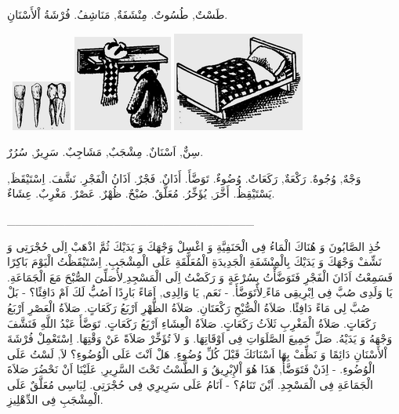 \documentclass[a5paper]{article}
\begin{document}
طَسْتٌ, طُسُوتٌ. مِنْشَفَةٌ, مَنَاشِفُ. فُرْشَةُ اْلأَسْنَانِ. 

\  \includegraphics[width=0.7709in,height=0.6457in]{MuhammadBagauddinlatinized-img210.png}   \includegraphics[width=1.2811in,height=1.2398in]{MuhammadBagauddinlatinized-img211.png}   \includegraphics[width=1.7083in,height=1.2811in]{MuhammadBagauddinlatinized-img212.png} 

سِنٌّ, اَسْنَانٌ. مِشْجَبٌ, مَشَاجِبٌ. سَرِيرٌ, سُرُرٌ. 

وَجْهٌ, وُجُوهٌ. رَكْعَةٌ, رَكَعَاتٌ. وُضُوءٌ. تَوَضَّأَ. أَذَانٌ. فَجْرٌ. اَذَانُ الْفَجْرِ. نَشَّفَ. اِسْتَيْقَظَ, يَسْتَيْقِظُ. أَخَّرَ, يُؤَخِّرُ. مُعَلَّقٌ. صُبْحٌ. ظُهْرٌ. عَصْرٌ. مَغْرِبٌ. عِشَاءٌ.

\_\_\_\_\_\_\_\_\_\_\_\_\_\_\_\_\_\_\_\_\_\_\_\_\_\_\_\_\_\_

خُذِ الصَّابُونَ وَ هُنَاكَ الْمَاءُ فِى الْحَنَفِيَّةِ وَ اغْسِلْ وَجْهَكَ وَ يَدَيْكَ ثُمَّ اذْهَبْ اِلَى حُجْرَتِى وَ نَشِّفْ وَجْهَكَ وَ يَدَيْكَ بِالْمِنْشَفَةِ الْجَدِيدَةِ الْمُعَلَّقَةِ عَلَى الْمِشْجَبِ. اِسْتَيْقَظْتُ الْيَوْمَ بَاكِرًا فَسَمِعْتُ اَذَانَ الْفَجْرِ فَتَوَضَّأْتُ بِسُرْعَةٍ وَ رَكَضْتُ اِلَى الْمَسْجِدِ ِلأُصَلِّىَ الصُّبْحَ مَعَ الْجَمَاعَةِ. يَا وَلَدِى صُبَّ فِى اِبْرِيقِى مَاءً ِلأَتَوَضَّأَ. - نَعَم, يَا وَالِدِى, اَمَاءً بَارِدًا اَصُبُّ لَكَ اَمْ دَافِئًا؟ - بَلْ صُبَّ لِى مَاءً دَافِئًا. صَلاَةُ الْصُّبْحِ رَكْعَتَانِ. صَلاَةُ الظُّهْرِ اَرْبَعُ رَكَعَاتٍ. صَلاَةُ الْعَصْرِ اَرْبَعُ رَكَعَاتٍ. صَلاَةُ الْمَغْرِبِ ثَلاَثُ رَكَعَاتٍ. صَلاَةُ الْعِشَاءِ اَرْبَعُ رَكَعَاتٍ. تَوَضَّأَ عَبْدُ اللَّهِ فَنَشَّفَ وَجْهَهُ وَ يَدَيْهُ. صَلِّ جَمِيعَ الصَّلَوَاتِ فِى اَوْقَاتِهَا. وَ لاَ تُؤَخِّرْ صَلاَةً عَنْ وَقْتِهَا. اِسْتَعْمِلْ فُرْشَةَ اْلأَسْنَانِ دَائِمًا وَ نَظِّفْ بِهَا اَسْنَانَكَ قَبْلَ كُلِّ وُضُوءٍ. هَلْ اَنْتَ عَلَى الْوُضُوءِ؟ لاَ, لَسْتُ عَلَى الْوُضُوءِ. - اِذَنْ فَتَوَضَّأْ, هَذَا هُوَ اْلإِبْرِيقُ وَ الطَّسْتُ تَحْتَ السَّرِيرِ, عَلَيْنَا اَنْ نَحْضُرَ صَلاَةَ الْجَمَاعَةِ فِى الْمَسْجِدِ. اَيْنَ تَنَامُ؟ - اَنَامُ عَلَى سَرِيرِي فِى حُجْرَتِى. لِبَاسِى مُعَلَّقٌ عَلَى الْمِشْجَبِ فِى الدِّهْلِيزِ.
\end{document}
